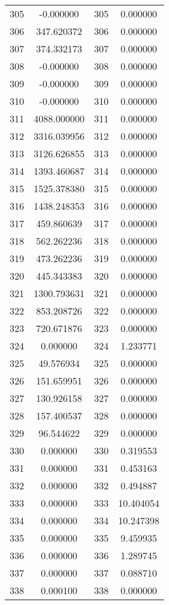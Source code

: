 \documentclass[12pt]{article}
\begin{document}
\begin{longtable}{@{}cccc@{}}
305 & -0.000000 & 305 & 0.000000 \\
306 & 347.620372 & 306 & 0.000000 \\
307 & 374.332173 & 307 & 0.000000 \\
308 & -0.000000 & 308 & 0.000000 \\
309 & -0.000000 & 309 & 0.000000 \\
310 & -0.000000 & 310 & 0.000000 \\
311 & 4088.000000 & 311 & 0.000000 \\
312 & 3316.039956 & 312 & 0.000000 \\
313 & 3126.626855 & 313 & 0.000000 \\
314 & 1393.460687 & 314 & 0.000000 \\
315 & 1525.378380 & 315 & 0.000000 \\
316 & 1438.248353 & 316 & 0.000000 \\
317 & 459.860639 & 317 & 0.000000 \\
318 & 562.262236 & 318 & 0.000000 \\
319 & 473.262236 & 319 & 0.000000 \\
320 & 445.343383 & 320 & 0.000000 \\
321 & 1300.793631 & 321 & 0.000000 \\
322 & 853.208726 & 322 & 0.000000 \\
323 & 720.671876 & 323 & 0.000000 \\
324 & 0.000000 & 324 & 1.233771 \\
325 & 49.576934 & 325 & 0.000000 \\
326 & 151.659951 & 326 & 0.000000 \\
327 & 130.926158 & 327 & 0.000000 \\
328 & 157.400537 & 328 & 0.000000 \\
329 & 96.544622 & 329 & 0.000000 \\
330 & 0.000000 & 330 & 0.319553 \\
331 & 0.000000 & 331 & 0.453163 \\
332 & 0.000000 & 332 & 0.494887 \\
333 & 0.000000 & 333 & 10.404054 \\
334 & 0.000000 & 334 & 10.247398 \\
335 & 0.000000 & 335 & 9.459935 \\
336 & 0.000000 & 336 & 1.289745 \\
337 & 0.000000 & 337 & 0.088710 \\
338 & 0.000100 & 338 & 0.000000 \\

\end{longtable}
\end{document}
